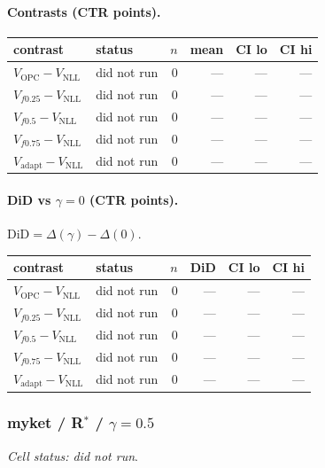 \documentclass[10pt,a4paper]{article}
\begin{document}
\paragraph{Contrasts (CTR points).}
{\centering\small\begin{tabular}{llrrrr}
\toprule contrast & status & $n$ & mean & CI lo & CI hi \\
\midrule
$V_{\mathrm{OPC}}-V_{\mathrm{NLL}}$ & did not run & 0 & --- & --- & --- \\
$V_{f0.25}-V_{\mathrm{NLL}}$ & did not run & 0 & --- & --- & --- \\
$V_{f0.5}-V_{\mathrm{NLL}}$ & did not run & 0 & --- & --- & --- \\
$V_{f0.75}-V_{\mathrm{NLL}}$ & did not run & 0 & --- & --- & --- \\
$V_{\mathrm{adapt}}-V_{\mathrm{NLL}}$ & did not run & 0 & --- & --- & --- \\
\bottomrule\end{tabular}\par}
\paragraph{DiD vs $\gamma=0$ (CTR points).} $\mathrm{DiD}=\Delta(\gamma)-\Delta(0)$.
{\centering\small\begin{tabular}{llrrrr}
\toprule contrast & status & $n$ & DiD & CI lo & CI hi \\
\midrule
$V_{\mathrm{OPC}}-V_{\mathrm{NLL}}$ & did not run & 0 & --- & --- & --- \\
$V_{f0.25}-V_{\mathrm{NLL}}$ & did not run & 0 & --- & --- & --- \\
$V_{f0.5}-V_{\mathrm{NLL}}$ & did not run & 0 & --- & --- & --- \\
$V_{f0.75}-V_{\mathrm{NLL}}$ & did not run & 0 & --- & --- & --- \\
$V_{\mathrm{adapt}}-V_{\mathrm{NLL}}$ & did not run & 0 & --- & --- & --- \\
\bottomrule\end{tabular}\par}
\bigskip
\subsubsection{myket / R$^*$ / $\gamma=0.5$}
\emph{Cell status: did not run}.
\end{document}
